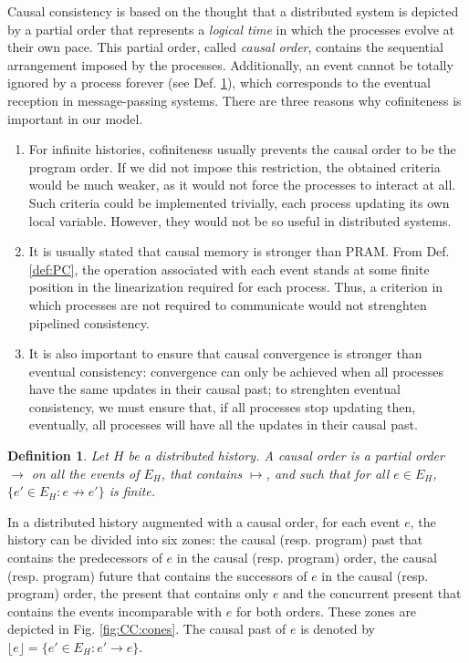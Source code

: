 \documentclass[9pt,numbers]{sigplanconf}
\newtheorem{definition}{Definition}
\begin{document}
Causal consistency is based on the thought that a distributed system is depicted
by a partial order that represents a \emph{logical time} in which the processes
evolve at their own pace. This partial order, called \emph{causal order}, contains 
the sequential arrangement imposed by the processes. Additionally, an event cannot 
be totally ignored by a process forever (see Def. \ref{def:causal_order}), which 
corresponds to the eventual reception in message-passing systems. There are three reasons why 
cofiniteness is important in our model.
\begin{enumerate}
\item For infinite histories, cofiniteness usually prevents the causal order to be the program order. 
  If we did not impose this restriction, the obtained criteria would be much weaker, as it would not force the processes to 
  interact at all. Such criteria could be implemented trivially, each process updating its own local 
  variable. However, they would not be so useful in distributed systems. 
\item It is usually stated that causal memory is stronger than PRAM. From 
  Def. \ref{def:PC}, the operation associated with each event stands at some finite 
  position in the linearization required for each process. Thus, a criterion in which 
  processes are not required to communicate would not strenghten pipelined consistency.
\item It is also important to ensure that causal convergence is stronger than eventual consistency:
  convergence can only be achieved when all processes have the same updates in their causal past;
  to strenghten eventual consistency, we must ensure that, if all processes stop updating then, eventually,
  all processes will have all the updates in their causal past.
\end{enumerate}
\begin{definition}\label{def:causal_order}
  Let $H$ be a distributed history.
  A \emph{causal order} is a partial order $\rightarrow$ on all the events of $E_H$, 
  that contains $\mapsto$, and such that for all $e\in E_H$, 
  $\{e'\in E_H : e\not\rightarrow e'\}$ is finite.
\end{definition}

In a distributed history augmented with a causal order, for each event $e$, the history
can be divided into six zones: the causal (resp. program) past that contains the predecessors
of $e$ in the causal (resp. program) order, the causal (resp. program) future that contains the 
successors of $e$ in the causal (resp. program) order, the present that contains only $e$ and 
the concurrent present that contains the events incomparable with $e$ for both orders. These zones 
are depicted in Fig. \ref{fig:CC:cones}. The causal past of $e$ is denoted 
by $\lfloor e\rfloor = \{e'\in E_H : e'\rightarrow e\}$. 
\end{document}
